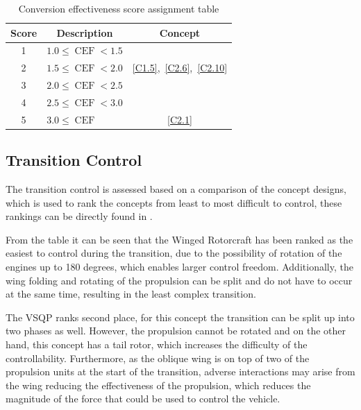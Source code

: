 \begin{table}[ht]
\centering
\caption{Conversion effectiveness score assignment table}
\label{tab:cefscores}
\begin{tabular}{c|l|c}
\toprule
  
\textbf{Score} & \multicolumn{1}{c|}{\textbf{Description}} & \textbf{Concept} \\ \bottomrule
\rowcolor[HTML]{FD6864} 
1              & $1.0 \leq \operatorname{CEF} < 1.5$ &                  \\
\rowcolor[HTML]{FCBF7B} 
2              & $1.5 \leq \operatorname{CEF} < 2.0$ & \ref{C1.5},~\ref{C2.6},~\ref{C2.10}   \\
\rowcolor[HTML]{E0E383} 
3              & $2.0 \leq \operatorname{CEF} < 2.5$ &                  \\
\rowcolor[HTML]{A2D07F} 
4              & $2.5 \leq \operatorname{CEF} < 3.0$ &                  \\
\rowcolor[HTML]{63BE7B} 
5              & $3.0 \leq \operatorname{CEF}$       & \ref{C2.1}              \\ \toprule
\end{tabular}
\end{table}




\subsection{Transition Control}
\label{subsec:trade-off_Transition_Control}

The transition control is assessed based on a comparison of the concept designs, which is used to rank the concepts from least to most difficult to control, these rankings can be directly found in .

From the table it can be seen that the Winged Rotorcraft has been ranked as the easiest to control during the transition, due to the possibility of rotation of the engines up to 180 degrees, which enables larger control freedom.
Additionally, the wing folding and rotating of the propulsion can be split and do not have to occur at the same time, resulting in the least complex transition.

The VSQP ranks second place, for this concept the transition can be split up into two phases as well.
However, the propulsion cannot be rotated and on the other hand, this concept has a tail rotor, which increases the difficulty of the controllability.
Furthermore, as the oblique wing is on top of two of the propulsion units at the start of the transition, adverse interactions may arise from the wing reducing the effectiveness of the propulsion, which reduces the magnitude of the force that could be used to control the vehicle.

